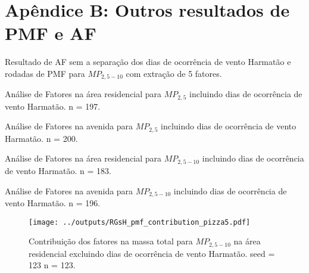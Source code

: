 \chapter{Apêndice B: Outros resultados de PMF e AF \label{apendice:pmf_fa}}

Resultado de AF sem a separação dos dias de ocorrência de vento Harmatão e 
rodadas de PMF para $MP_{2,5-10}$ com extração de 5 fatores. 

\begin{table}[H]
  \centering
  \caption{Análise de Fatores na área residencial para $MP_{2,5}$
          incluindo dias de ocorrência de vento Harmatão. n = 197.
          \label{table:AF_RFcH5}}
  
\end{table}

\begin{table}[H]
  \centering
  \caption{Análise de Fatores na avenida para $MP_{2,5}$
           incluindo dias de ocorrência de vento Harmatão. n = 200.
          \label{table:AF_TFcH5}}
  
\end{table}

\begin{table}[H]
  \centering
  \caption{Análise de Fatores na área residencial para $MP_{2,5-10}$
          incluindo dias de ocorrência de vento Harmatão. n = 183.
          \label{table:AG_RFcH4}}
  
\end{table}

\begin{table}[H]
  \centering
  \caption{Análise de Fatores na avenida para $MP_{2,5-10}$
           incluindo dias de ocorrência de vento Harmatão. n = 196.
          \label{table:AF_TGcH4}}
  
\end{table}

\begin{landscape}
  \begin{figure}
    \centering
    \begin{minipage}[b]{0.45\linewidth}
      \texttt{[image: ../outputs/RGsH\_pmf\_contribution\_pizza5.pdf]}
      \caption{Contribuição dos fatores na massa total para $MP_{2,5-10}$ na área
               residencial excluindo dias de ocorrência de vento Harmatão. seed = 123 n = 123.
               \label{fig:RGsH_contribution5}}
    \end{minipage}%
    \hspace{0.5cm}
    \begin{minipage}[b]{0.45\linewidth}
      
    \end{minipage}
  \end{figure}
\end{landscape}

